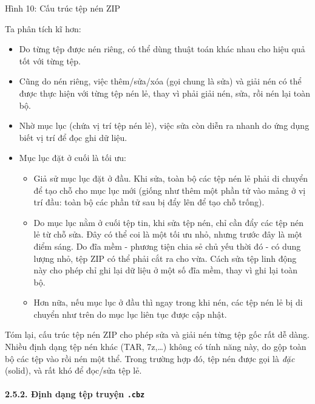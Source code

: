Hình 10: Cấu trúc tệp nén ZIP

Ta phân tích kĩ hơn:

\begin{itemize}
  \item
        Do từng tệp được nén riêng, có thể dùng thuật toán khác nhau cho hiệu
        quả tốt với từng tệp.
  \item
        Cũng do nén riêng, việc thêm/sửa/xóa (gọi chung là sửa) và giải nén có
        thể được thực hiện với từng tệp nén lẻ, thay vì phải giải nén, sửa,
        rồi nén lại toàn bộ.
  \item
        Nhờ mục lục (chứa vị trí tệp nén lẻ), việc sửa còn diễn ra nhanh do
        ứng dụng biết vị trí để đọc ghi dữ liệu.
  \item
        Mục lục đặt ở cuối là tối ưu:

        \begin{itemize}
          
          \item
                Giả sử mục lục đặt ở đầu. Khi sửa, toàn bộ các tệp nén lẻ phải di
                chuyển để tạo chỗ cho mục lục mới (giống như thêm một phần tử vào
                mảng ở vị trí đầu: toàn bộ các phần tử sau bị đẩy lên để tạo chỗ
                trống).
          \item
                Do mục lục nằm ở cuối tệp tin, khi sửa tệp nén, chỉ cần đẩy các tệp
                nén lẻ từ chỗ sửa. Đây có thể coi là một tối ưu nhỏ, nhưng trước đây
                là một điểm sáng. Do đĩa mềm - phương tiện chia sẻ chủ yếu thời đó -
                có dung lượng nhỏ, tệp ZIP có thể phải cắt ra cho vừa. Cách sửa tệp
                linh động này cho phép chỉ ghi lại dữ liệu ở một số đĩa mềm, thay vì
                ghi lại toàn bộ.
          \item
                Hơn nữa, nếu mục lục ở đầu thì ngay trong khi nén, các tệp nén lẻ bị
                di chuyển như trên do mục lục liên tục được cập nhật.
        \end{itemize}
\end{itemize}

Tóm lại, cấu trúc tệp nén ZIP cho phép sửa và giải nén từng tệp gốc rất
dễ dàng. Nhiều định dạng tệp nén khác (TAR, 7z,\ldots) không có tính
năng này, do gộp toàn bộ các tệp vào rồi nén một thể. Trong trường hợp
đó, tệp nén được gọi là \emph{đặc} (solid), và rất khó để đọc/sửa tệp
lẻ.

\hypertarget{ux111ux1ecbnh-dux1ea1ng-tux1ec7p-truyux1ec7n-.cbz}{%
  \paragraph{\texorpdfstring{2.5.2. Định dạng tệp truyện
      \texttt{.cbz}}{2.5.2. Định dạng tệp truyện .cbz}}\label{ux111ux1ecbnh-dux1ea1ng-tux1ec7p-truyux1ec7n-.cbz}}

